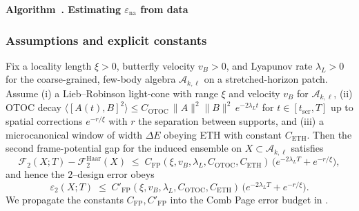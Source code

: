 \documentclass[aps,prd,preprint,onecolumn,superscriptaddress,nofootinbib,longbibliography,floatfix,11pt,showpacs,showkeys]{revtex4-2}
\newcounter{algorithm}
\newcommand{\algcaptionname}{Algorithm}
\newcommand{\hmcalgOldCaption}{}
\newenvironment{algorithm}[1][]{%
  \refstepcounter{algorithm}%
  \begin{infobox}%
  \let\hmcalgOldCaption\caption
  \renewcommand{\caption}[1]{\noindent\textbf{\algcaptionname~\thealgorithm. ##1}\\[0.6ex]}%
}{%
  \par\vspace{-0.4\baselineskip}%
  \let\caption\hmcalgOldCaption
  \end{infobox}%
}
\theoremstyle{plain}
\theoremstyle{definition}
\theoremstyle{remark}
\begin{document}
\begin{algorithm}[t]
\caption{Estimating $\varepsilon_{\mathrm{na}}$ from data}
\label{alg:ena}
\end{algorithm}

\subsubsection{Assumptions and explicit constants}
Fix a locality length $\xi>0$, butterfly velocity $v_B>0$, and Lyapunov rate $\lambda_L>0$ for the coarse-grained,
few-body algebra $\mathscr{A}_{k,\ell}$ on a stretched-horizon patch. Assume (i) a Lieb--Robinson light-cone
with range $\xi$ and velocity $v_B$ for $\mathscr{A}_{k,\ell}$, (ii) OTOC decay
$\langle [A(t),B]^2\rangle \le C_{\mathrm{OTOC}}\,\|A\|^2\|B\|^2\,e^{-2\lambda_L t}$
for $t\in[t_{\mathrm{scr}},T]$ up to spatial corrections $e^{-r/\xi}$ with $r$ the separation between supports,
and (iii) a microcanonical window of width $\Delta E$ obeying ETH with constant $C_{\mathrm{ETH}}$.
Then the second frame-potential gap for the induced ensemble on $X\subset\mathscr{A}_{k,\ell}$ satisfies
\begin{equation}
\label{eq:fp-gap-constants}
\mathcal{F}_2(X;T)-\mathcal{F}_2^{\mathrm{Haar}}(X)
\;\le\; C_{\mathrm{FP}}(\xi,v_B,\lambda_L,C_{\mathrm{OTOC}},C_{\mathrm{ETH}})\,
\big( e^{-2\lambda_L T} + e^{-r/\xi} \big),
\end{equation}
and hence the $2$--design error obeys
\begin{equation}
\label{eq:eps2-constants}
\varepsilon_2(X;T)\;\le\;C'_{\mathrm{FP}}(\xi,v_B,\lambda_L,C_{\mathrm{OTOC}},C_{\mathrm{ETH}})\,
\big( e^{-2\lambda_L T} + e^{-r/\xi} \big).
\end{equation}
We propagate the constants $C_{\mathrm{FP}},C'_{\mathrm{FP}}$ into the Comb Page error budget in .
\end{document}
